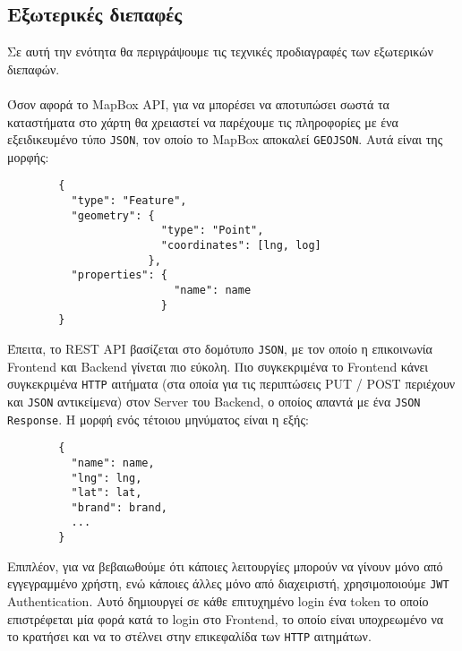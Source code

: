\subsection{Εξωτερικές διεπαφές}
Σε αυτή την ενότητα θα περιγράψουμε τις τεχνικές προδιαγραφές των εξωτερικών διεπαφών.\\ \hfill \\
Όσον αφορά το MapBox API, για να μπορέσει να αποτυπώσει σωστά τα καταστήματα στο χάρτη θα χρειαστεί να παρέχουμε τις πληροφορίες με ένα εξειδικευμένο τύπο \texttt{JSON}, τον οποίο το MapBox αποκαλεί \texttt{GEOJSON}. Αυτά είναι της μορφής:
\begin{center}
    \begin{lstlisting}
        {
          "type": "Feature",
          "geometry": {
                        "type": "Point",
                        "coordinates": [lng, log]
                      },
          "properties": {
                          "name": name
                        }
        }
        \end{lstlisting}
\end{center}

Έπειτα, το REST API βασίζεται στο δομότυπο \texttt{JSON}, με τον οποίο η επικοινωνία Frontend και Backend γίνεται πιο εύκολη. Πιο συγκεκριμένα το Frontend κάνει συγκεκριμένα \texttt{HTTP} αιτήματα (στα οποία για τις περιπτώσεις PUT / POST περιέχουν και \texttt{JSON} αντικείμενα) στον Server του Backend, ο οποίος απαντά με ένα \texttt{JSON Response}. Η μορφή ενός τέτοιου μηνύματος είναι η εξής:

\begin{center}
    \begin{lstlisting}
        {
          "name": name,
          "lng": lng,
          "lat": lat,
          "brand": brand,
          ...
        }
        \end{lstlisting} 
\end{center}
Επιπλέον, για να βεβαιωθούμε ότι κάποιες λειτουργίες μπορούν να γίνουν μόνο από εγγεγραμμένο χρήστη, ενώ κάποιες άλλες μόνο από διαχειριστή, χρησιμοποιούμε \texttt{JWT} Authentication. Αυτό δημιουργεί σε κάθε επιτυχημένο login ένα token το οποίο επιστρέφεται μία φορά κατά το login στο Frontend, το οποίο είναι υποχρεωμένο να το κρατήσει και να το στέλνει στην επικεφαλίδα των \texttt{HTTP} αιτημάτων.
